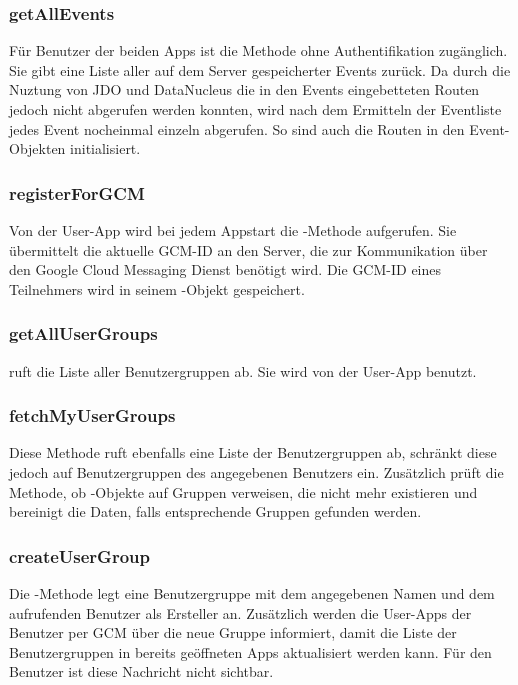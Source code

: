 \subsubsection*{getAllEvents}
Für Benutzer der beiden Apps ist die Methode  ohne Authentifikation zugänglich. Sie gibt eine Liste aller auf dem Server gespeicherter Events zurück. Da durch die Nuztung von JDO und DataNucleus die in den Events eingebetteten Routen jedoch nicht abgerufen werden konnten, wird nach dem Ermitteln der Eventliste jedes Event nocheinmal einzeln abgerufen. So sind auch die Routen in den Event-Objekten initialisiert.

\subsubsection*{registerForGCM}
Von der User-App wird bei jedem Appstart die -Methode aufgerufen. Sie übermittelt die aktuelle GCM-ID an den Server, die zur Kommunikation über den Google Cloud Messaging Dienst benötigt wird. Die GCM-ID eines Teilnehmers wird in seinem -Objekt gespeichert.

\subsubsection*{getAllUserGroups}
 ruft die Liste aller Benutzergruppen ab. Sie wird von der User-App benutzt.

\subsubsection*{fetchMyUserGroups}
Diese Methode ruft ebenfalls eine Liste der Benutzergruppen ab, schränkt diese jedoch auf Benutzergruppen des angegebenen Benutzers ein. Zusätzlich prüft die Methode, ob -Objekte auf Gruppen verweisen, die nicht mehr existieren und bereinigt die Daten, falls entsprechende Gruppen gefunden werden.

\subsubsection*{createUserGroup}
Die -Methode legt eine Benutzergruppe mit dem angegebenen Namen und dem aufrufenden Benutzer als Ersteller an. Zusätzlich werden die User-Apps der Benutzer per GCM über die neue Gruppe informiert, damit die Liste der Benutzergruppen in bereits geöffneten Apps aktualisiert werden kann. Für den Benutzer ist diese Nachricht nicht sichtbar.

